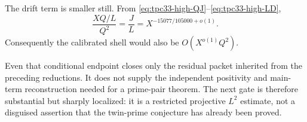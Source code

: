 The drift term is smaller still.  From
\eqref{eq:tpc33-high-QJ}--\eqref{eq:tpc33-high-LD},
\begin{equation}
 \frac{XQ/L}{Q^2}
 =\frac JL
 =X^{-15077/105000+o(1)}.
 \label{eq:tpc33-high-drift-ratio}
\end{equation}
Consequently the calibrated shell would also be
\(O(X^{o(1)}Q^2)\).

Even that conditional endpoint closes only the residual packet inherited
from the preceding reductions.  It does not supply the independent
positivity and main-term reconstruction needed for a prime-pair theorem.
The next gate is therefore substantial but sharply localized: it is a
restricted projective \(L^2\) estimate, not a disguised assertion that
the twin-prime conjecture has already been proved.
